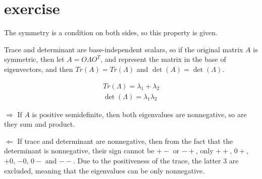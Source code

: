 \documentclass{article}
\begin{document}
\section{exercise}
The symmetry is a condition on both sides, so this property is given.

Trace and determinant are base-independent scalars,
so if the original matrix $A$ is symmetric, then let $A={O\Lambda {O^T}}$,
and represent the matrix in the base of eigenvectors,
and then $Tr\left( A \right) = Tr\left( \Lambda  \right)$ and
$\det \left( A \right) = \det \left( \Lambda  \right)$.

\[\begin{array}{l}
        Tr\left( \Lambda  \right) = {\lambda _1} + {\lambda _2} \\
        \det \left( \Lambda  \right) = {\lambda _1}{\lambda _2}
    \end{array}\]

$ \Rightarrow $ If $A$ is positive semidefinite,
then both eigenvalues are nonnegative,
so are they sum and product.

$ \Leftarrow $ If trace and determinant are nonnegative,
then from the fact that the determinant is nonnegative,
their sign cannot be $+-$ or $-+$, only $++$, $0+$, $+0$, $-0$, $0-$ and $--$.
Due to the positiveness of the trace, the latter 3 are excluded,
meaning that the eigenvalues can be only nonnegative.
\end{document}
